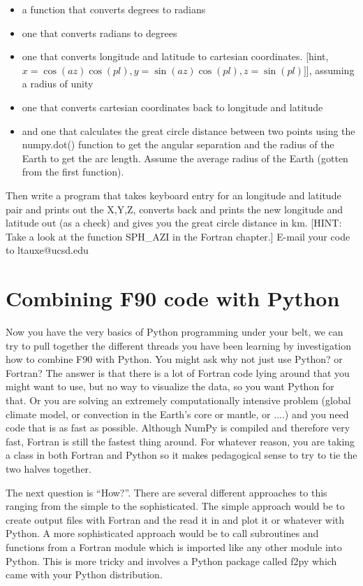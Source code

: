 {{\begin{itemize}
Also include the average radius of: 6,371 km
\item a function that converts degrees to radians
\item one that converts radians to degrees
\item one that converts longitude and latitude to cartesian coordinates. [hint, $x=\cos(az)\cos(pl),y=\sin(az)\cos(pl),z=\sin(pl)]$], assuming a radius of unity
\item one that converts cartesian coordinates back to longitude and latitude
\item and one that calculates the great circle distance between two points using the {\color{blue}numpy.dot()} function  to get the angular separation and the radius of the Earth to get the arc length.   Assume the average radius of the Earth (gotten from the first function).
\end{itemize}
Then write a  program that takes keyboard entry for an longitude and latitude pair and prints out the X,Y,Z,  
converts back and prints the new longitude and latitude out (as a check) and gives you the great circle distance in km. [HINT: Take a look at the function {\color{blue}SPH\_AZI} in the Fortran chapter.]
E-mail your code to ltauxe@ucsd.edu}


\section{Combining F90 code with Python}

Now you have the very basics of Python programming under your belt, we can try to pull together the different threads you have been learning by investigation how to combine F90 with Python.  You might ask why not just use Python?  or Fortran?  The answer is that there is a lot of Fortran code lying around that you might want to use, but no way to visualize the data, so you want Python for that.  Or you are solving an extremely computationally intensive problem (global climate model, or convection in the Earth's core or mantle, or ....) and you need code that is  as fast as possible. Although {\color{blue}NumPy} is compiled and therefore very fast,  Fortran is still the fastest thing around.  For whatever reason, you are taking a class in both Fortran and Python so it makes pedagogical sense to try to tie the two halves together.  

The next question is ``How?''.  There are several different approaches to this ranging from the simple to the sophisticated.  The simple approach would be to create output files with Fortran and the read it in and plot it or whatever with Python.  A more sophisticated approach would be to call subroutines and functions from a Fortran module which is imported like any other module into Python.   This is more tricky and involves a Python package called {\color{blue}f2py} which came with your Python distribution.  



}
